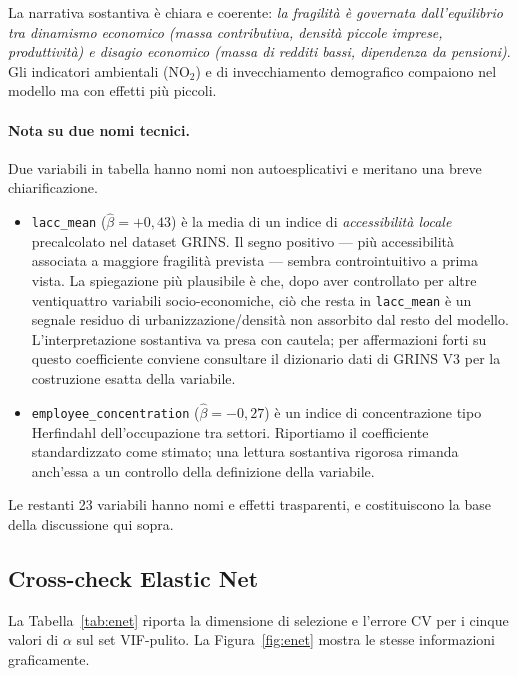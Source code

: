 \documentclass[11pt,a4paper]{article}
\begin{document}
\noindent La narrativa sostantiva \`e chiara e coerente:
\emph{la fragilit\`a \`e governata dall'equilibrio tra dinamismo
economico (massa contributiva, densit\`a piccole imprese,
produttivit\`a) e disagio economico (massa di redditi bassi,
dipendenza da pensioni)}. Gli indicatori ambientali
(\(\mathrm{NO}_{2}\)) e di invecchiamento demografico compaiono nel
modello ma con effetti pi\`u piccoli.

\paragraph{Nota su due nomi tecnici.}
Due variabili in tabella hanno nomi non autoesplicativi e meritano
una breve chiarificazione.
\begin{itemize}[leftmargin=2em]
  \item \texttt{lacc\_mean} (\(\hat\beta = +0{,}43\)) \`e la media
    di un indice di \emph{accessibilit\`a locale} precalcolato nel
    dataset GRINS. Il segno positivo --- pi\`u accessibilit\`a
    associata a maggiore fragilit\`a prevista --- sembra
    controintuitivo a prima vista. La spiegazione pi\`u plausibile
    \`e che, dopo aver controllato per altre ventiquattro variabili
    socio-economiche, ci\`o che resta in \texttt{lacc\_mean} \`e un
    segnale residuo di urbanizzazione/densit\`a non assorbito dal
    resto del modello. L'interpretazione sostantiva va presa con
    cautela; per affermazioni forti su questo coefficiente conviene
    consultare il dizionario dati di GRINS V3 per la costruzione
    esatta della variabile.
  \item \texttt{employee\_concentration} (\(\hat\beta = -0{,}27\))
    \`e un indice di concentrazione tipo Herfindahl
    dell'occupazione tra settori. Riportiamo il coefficiente
    standardizzato come stimato; una lettura sostantiva rigorosa
    rimanda anch'essa a un controllo della definizione della
    variabile.
\end{itemize}
Le restanti 23 variabili hanno nomi e effetti trasparenti, e
costituiscono la base della discussione qui sopra.

\subsection{Cross-check Elastic Net}

La Tabella~\ref{tab:enet} riporta la dimensione di selezione e
l'errore CV per i cinque valori di $\alpha$ sul set VIF-pulito. La
Figura~\ref{fig:enet} mostra le stesse informazioni graficamente.
\end{document}
